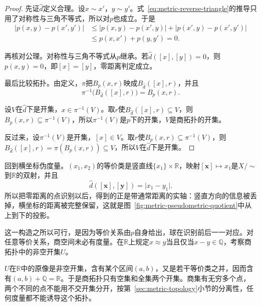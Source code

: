 \begin{proof}
先证$\hat d$定义合理。设$x\sim x'$，$y\sim y'$。式~\eqref{eq:metric-reverse-triangle}的推导只用了对称性与三角不等式，所以对$p$也成立。于是
\[
\begin{aligned}
\lvert p(x,y)-p(x',y')\rvert
&\leq\lvert p(x,y)-p(x',y)\rvert+\lvert p(x',y)-p(x',y')\rvert\\
&\leq p(x,x')+p(y,y')=0.
\end{aligned}
\]

再核对公理。对称性与三角不等式从$p$继承。若$\hat d([x],[y])=0$，则$p(x,y)=0$，即$[x]=[y]$，零距离判定成立。

最后比较拓扑。由定义，$\pi$把$B_p(x,r)$映成$B_{\hat d}([x],r)$，并且
\[
\pi^{-1}\bigl(B_{\hat d}([x],r)\bigr)=B_p(x,r).
\]

设$V$在$\hat d$下是开集，$x\in\pi^{-1}(V)$。取$r$使$B_{\hat d}([x],r)\subseteq V$，则$B_p(x,r)\subseteq\pi^{-1}(V)$，所以$\pi^{-1}(V)$是$p$下的开集，$V$是商拓扑的开集。

反过来，设$\pi^{-1}(V)$是开集，$[x]\in V$。取$r$使$B_p(x,r)\subseteq\pi^{-1}(V)$，则$B_{\hat d}([x],r)=\pi(B_p(x,r))\subseteq V$，所以$V$在$\hat d$下是开集。
\end{proof}

回到横坐标伪度量。$(x_1,x_2)$的等价类是竖直线$\{x_1\}\times\mathbb R$，映射$[\bm x]\mapsto x_1$是$X/{\sim}$到$\mathbb R$的双射，并且
\[
\hat d([\bm x],[\bm y])=\lvert x_1-y_1\rvert.
\]
所以把零距离的点识别以后，得到的正是带通常距离的实轴：竖直方向的信息被丢掉，横坐标的距离被完整保留，这就是图~\ref{fig:metric-pseudometric-quotient}中从上到下的投影。

这一构造之所以可行，是因为等价关系由$p$自身给出，球在识别前后一一对应。对任意等价关系，商空间未必有度量。在$\mathbb R$上规定$x\approx y$当且仅当$x-y\in\mathbb Q$，考察商拓扑中的非空开集$U$。

$U$在$\mathbb R$中的原像是非空开集，含有某个区间$(a,b)$，又是若干等价类之并，因而含有$(a,b)+\mathbb Q=\mathbb R$。于是商拓扑只有空集和全集两个开集。商集有无穷多个点，两个不同的点不能用不交开集分开，按第~\ref{sec:metric-topology}小节的分离性，任何度量都不能诱导这个拓扑。
